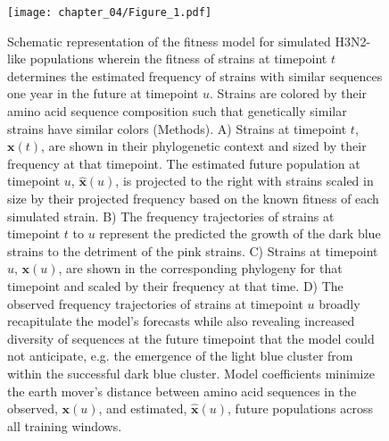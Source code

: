 \begin{figure}
  \begin{center}
  \texttt{[image: chapter\_04/Figure\_1.pdf]}
  \caption{
    Schematic representation of the fitness model for simulated H3N2-like populations wherein the fitness of strains at timepoint $t$ determines the estimated frequency of strains with similar sequences one year in the future at timepoint $u$.
    Strains are colored by their amino acid sequence composition such that genetically similar strains have similar colors (Methods).
    A) Strains at timepoint $t$, $\mathbf{x}(t)$, are shown in their phylogenetic context and sized by their frequency at that timepoint.
    The estimated future population at timepoint $u$, $\mathbf{\hat{x}}(u)$, is projected to the right with strains scaled in size by their projected frequency based on the known fitness of each simulated strain.
    B) The frequency trajectories of strains at timepoint $t$ to $u$ represent the predicted the growth of the dark blue strains to the detriment of the pink strains.
    C) Strains at timepoint $u$, $\mathbf{x}(u)$, are shown in the corresponding phylogeny for that timepoint and scaled by their frequency at that time.
    D) The observed frequency trajectories of strains at timepoint $u$ broadly recapitulate the model's forecasts while also revealing increased diversity of sequences at the future timepoint that the model could not anticipate, e.g. the emergence of the light blue cluster from within the successful dark blue cluster.
    Model coefficients minimize the earth mover's distance between amino acid sequences in the observed, $\mathbf{x}(u)$,  and estimated, $\mathbf{\hat{x}}(u)$, future populations across all training windows.
  }
  \label{fig:model}
  \end{center}
\end{figure}

